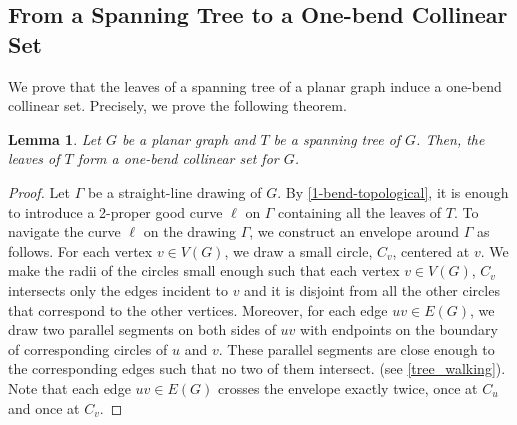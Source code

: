 \documentclass{article}
\newtheorem{lem}{Lemma}
\theoremstyle{definition}
\begin{document}
\subsection{From a Spanning Tree to a One-bend Collinear Set}

We prove that the leaves of a spanning tree of a planar graph induce a one-bend collinear set. Precisely, we prove the following theorem.

\begin{lem} \label{spanning_tree_to_collinear_set}
  Let $G$ be a planar graph and $T$ be a spanning tree of $G$. Then, the leaves of $T$ form a one-bend collinear set for $G$.
\end{lem}

\begin{proof}
    Let $\Gamma$ be a straight-line drawing of $G$.
    By \cref{1-bend-topological}, it is enough to introduce a 2-proper good curve $\ell$ on $\Gamma$ containing all the leaves of $T$. To navigate the curve $\ell$ on the drawing $\Gamma$, we construct an envelope around $\Gamma$ as follows. For each vertex $v \in V(G)$, we draw a small circle, $C_v$, centered at $v$. We make the radii of the circles small enough such that each vertex $v \in V(G)$, $C_v$ intersects only the edges incident to $v$ and it is disjoint from all the other circles that correspond to the other vertices. Moreover, for each edge $uv \in E(G)$, we draw two parallel segments on both sides of $uv$ with endpoints on the boundary of corresponding circles of $u$ and $v$. These parallel segments are close enough to the corresponding edges such that no two of them intersect. (see \cref{tree_walking}). Note that each edge $uv \in E(G)$ crosses the envelope exactly twice, once at $C_u$ and once at $C_v$.


\end{proof}
\end{document}

